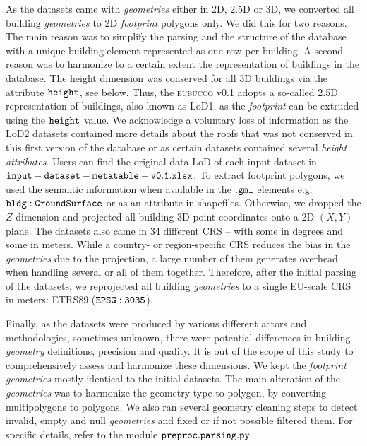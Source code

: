 \documentclass[fleqn,10pt]{wlscirep}
\begin{document}
As the datasets came with \textit{geometries} either in 2D, 2.5D or 3D, we converted all building \textit{geometries} to 2D \textit{footprint} polygons only. We did this for two reasons. The main reason was to simplify the parsing and the structure of the database with a unique building element represented as one row per building. A second reason was to harmonize to a certain extent the representation of buildings in the database. The height dimension was conserved for all 3D buildings via the attribute $\tt{height}$, see below. Thus, the \textsc{eubucco} v0.1 adopts a so-called 2.5D representation of buildings, also known as LoD1, as the \textit{footprint} can be extruded using the $\tt{height}$ value. We acknowledge a voluntary loss of information as the LoD2 datasets contained more details about the roofs that was not conserved in this first version of the database or as certain datasets contained several \textit{height} \textit{attributes}. Users can find the original data LoD of each input dataset in ${\tt input-dataset-metatable-v0.1.xlsx}$. To extract footprint polygons, we used the semantic information when available in the $\tt{.gml}$ elements e.g. $\tt{bldg:GroundSurface}$ or as an attribute in shapefiles. Otherwise, we dropped the $Z$ dimension and projected all building 3D point coordinates onto a 2D $(X,Y)$ plane. 
The datasets also came in 34 different CRS -- with some in degrees and some in meters. While a country- or region-specific CRS reduces the bias in the \textit{geometries} due to the projection, a large number of them generates overhead when handling several or all of them together. Therefore, after the initial parsing of the datasets, we reprojected all building \textit{geometries} to a single EU-scale CRS in meters: ETRS89 ($\tt{EPSG:3035}$).

Finally, as the datasets were produced by various different actors and methodologies, sometimes unknown, there were potential differences in building \textit{geometry} definitions, precision and quality. It is out of the scope of this study to comprehensively assess and harmonize these dimensions. We kept the \textit{footprint} \textit{geometries} mostly identical to the initial datasets. The main alteration of the \textit{geometries} was to harmonize the geometry type to polygon, by converting multipolygons to polygons. We also ran several geometry cleaning steps to detect invalid, empty and null \textit{geometries} and fixed or if not possible filtered them. For specific details, refer to the module $\tt{preproc.parsing.py}$ \cite{eubucco-0.1-code2022}
\end{document}
